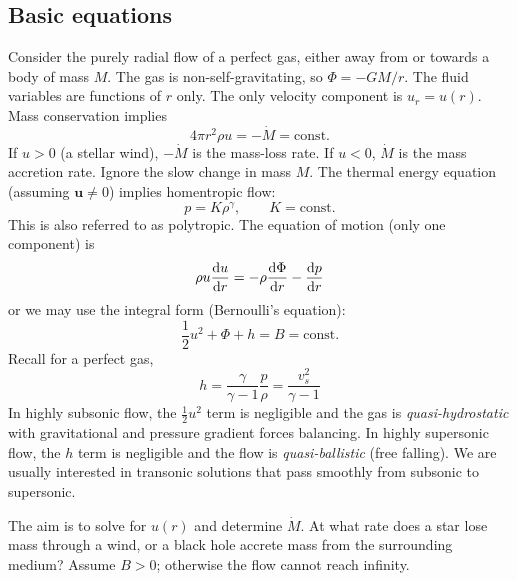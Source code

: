 \documentclass{jknotes}
\renewcommand{\u}{\symbf{u}}
\begin{document}
\subsection{Basic equations}
Consider the purely radial flow of a perfect gas, either away from or towards
a body of mass $M$. The gas is non-self-gravitating, so $\Phi = -GM/r$. The
fluid variables are functions of $r$ only. The only velocity component is $u_r
= u(r)$. Mass conservation implies
\begin{equation}
	4\pi r^2 \rho u = -\dot{M} = \text{const.}
\end{equation}
If $u > 0$ (a stellar wind), $-\dot{M}$ is the mass-loss rate. If $u < 0$,
$\dot{M}$ is the mass accretion rate. Ignore the slow change in mass $M$. The
thermal energy equation (assuming $\u \ne 0$) implies homentropic flow:
\begin{equation}
	p = K \rho^\gamma, \hspace{2em} K = \text{const.}
\end{equation}
This is also referred to as polytropic. The equation of motion (only one
component) is
\begin{equation}
	\rho u \frac{\diffd u}{\diffd r} = -\rho \frac{\diffd \Phi}{\diffd r} -
	\frac{\diffd p}{\diffd r}
\end{equation}
or we may use the integral form (Bernoulli's equation):
\begin{equation}
	\frac{1}{2}u^2 + \Phi + h = B = \text{const.}
\end{equation}
Recall for a perfect gas,
\begin{equation}
	h = \frac{\gamma}{\gamma -1}\frac{p}{\rho} = \frac{v_s^2}{\gamma -1}
\end{equation}
In highly subsonic flow, the $\frac{1}{2}u^2$ term is negligible and the gas
is \emph{quasi-hydrostatic} with gravitational and pressure gradient forces
balancing. In highly supersonic flow, the $h$ term is negligible and the flow
is \emph{quasi-ballistic} (free falling). We are usually interested in
transonic solutions that pass smoothly from subsonic to supersonic. 

The aim is to solve for $u(r)$ and determine $\dot{M}$. At what rate does a
star lose mass through a wind, or a black hole accrete mass from the
surrounding medium? Assume $B > 0$; otherwise the flow cannot reach infinity.
\end{document}
